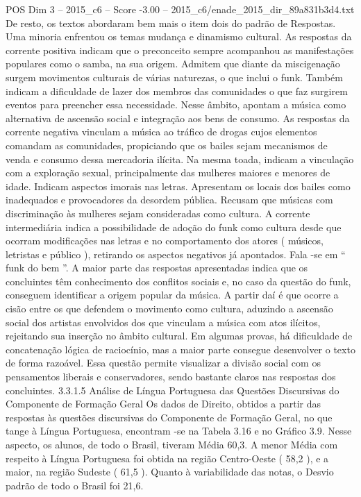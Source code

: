\begin{textsample}{POS Dim 3 – 2015\_c6 – Score -3.00 – 2015\_c6/enade\_2015\_dir\_89a831b3d4.txt}
De resto, os textos abordaram bem mais o item dois do padrão de Respostas.
Uma minoria enfrentou os temas mudança e dinamismo cultural.
As respostas da corrente positiva indicam que o preconceito sempre acompanhou as manifestações populares como o samba, na sua origem.
Admitem que diante da miscigenação surgem movimentos culturais de várias naturezas, o que inclui o funk.
Também indicam a dificuldade de lazer dos membros das comunidades o que faz surgirem eventos para preencher essa necessidade.
Nesse âmbito, apontam a música como alternativa de ascensão social e integração aos bens de consumo.
As respostas da corrente negativa vinculam a música ao tráfico de drogas cujos elementos comandam as comunidades, propiciando que os bailes sejam mecanismos de venda e consumo dessa mercadoria ilícita.
Na mesma toada, indicam a vinculação com a exploração sexual, principalmente das mulheres maiores e menores de idade.
Indicam aspectos imorais nas letras.
Apresentam os locais dos bailes como inadequados e provocadores da desordem pública.
Recusam que músicas com discriminação às mulheres sejam consideradas como cultura.
A corrente intermediária indica a possibilidade de adoção do funk como cultura desde que ocorram modificações nas letras e no comportamento dos atores ( músicos, letristas e público ), retirando os aspectos negativos já apontados.
Fala -se em “ funk do bem ”.
A maior parte das respostas apresentadas indica que os concluintes têm conhecimento dos conflitos sociais e, no caso da questão do funk, conseguem identificar a origem popular da música.
A partir daí é que ocorre a cisão entre os que defendem o movimento como cultura, aduzindo a ascensão social dos artistas envolvidos dos que vinculam a música com atos ilícitos, rejeitando sua inserção no âmbito cultural.
Em algumas provas, há dificuldade de concatenação lógica de raciocínio, mas a maior parte consegue desenvolver o texto de forma razoável.
Essa questão permite visualizar a divisão social com os pensamentos liberais e conservadores, sendo bastante claros nas respostas dos concluintes. 3.3.1.5 Análise de Língua Portuguesa das Questões Discursivas do Componente de Formação Geral Os dados de Direito, obtidos a partir das respostas às questões discursivas do Componente de Formação Geral, no que tange à Língua Portuguesa, encontram -se na Tabela 3.16 e no Gráfico 3.9.
Nesse aspecto, os alunos, de todo o Brasil, tiveram Média 60,3.
A menor Média com respeito à Língua Portuguesa foi obtida na região Centro-Oeste ( 58,2 ), e a maior, na região Sudeste ( 61,5 ).
Quanto à variabilidade das notas, o Desvio padrão de todo o Brasil foi 21,6.

\end{textsample}
